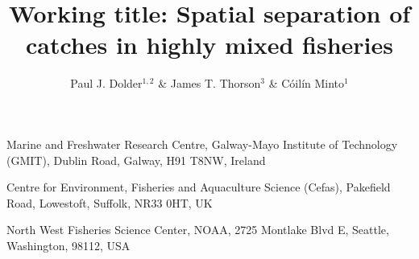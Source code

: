 \documentclass{nature}
\title{Working title: Spatial separation of catches in highly mixed fisheries}
\author{Paul J. Dolder$^{1,2}$ \& James T. Thorson$^3$ \& Cóilín Minto$^1$}
\begin{document}
\maketitle

\begin{affiliations}
\item Marine and Freshwater Research Centre, Galway-Mayo Institute of
	Technology (GMIT), Dublin Road, Galway, H91 T8NW, Ireland 
\item Centre for Environment, Fisheries and Aquaculture Science (Cefas),
	Pakefield Road, Lowestoft, Suffolk, NR33 0HT, UK
\item North West Fisheries Science Center, NOAA, 2725 Montlake Blvd E, Seattle,
	Washington, 98112, USA
\end{affiliations}

\end{document}
